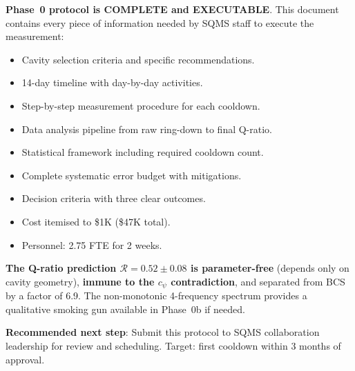 \documentclass[11pt]{article}
\theoremstyle{definition}
\theoremstyle{remark}
\begin{document}
\begin{tcolorbox}[colback=green!5!white, colframe=green!50!black,
  title=\textbf{W4i17 P11 BOTTOM LINE}]

\textbf{Phase~0 protocol is COMPLETE and EXECUTABLE}. This document
contains every piece of information needed by SQMS staff to execute
the measurement:

\begin{itemize}[nosep]
\item Cavity selection criteria and specific recommendations.
\item 14-day timeline with day-by-day activities.
\item Step-by-step measurement procedure for each cooldown.
\item Data analysis pipeline from raw ring-down to final Q-ratio.
\item Statistical framework including required cooldown count.
\item Complete systematic error budget with mitigations.
\item Decision criteria with three clear outcomes.
\item Cost itemised to \$1K (\$47K total).
\item Personnel: 2.75 FTE for 2 weeks.
\end{itemize}

\textbf{The Q-ratio prediction $\mathcal{R} = 0.52 \pm 0.08$ is
parameter-free} (depends only on cavity geometry), \textbf{immune
to the $c_\psi$ contradiction}, and separated from BCS by a factor
of 6.9. The non-monotonic 4-frequency spectrum provides a
qualitative smoking gun available in Phase~0b if needed.

\textbf{Recommended next step}: Submit this protocol to SQMS
collaboration leadership for review and scheduling. Target:
first cooldown within 3 months of approval.

\end{tcolorbox}
\end{document}
